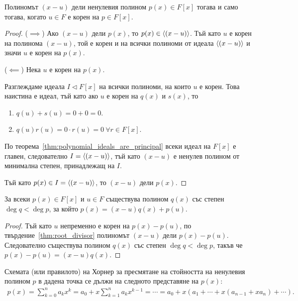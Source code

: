 \documentclass[numbers=endperiod, bibliography=totocnumbered]{scrartcl}
\begin{document}
\begin{proposition}\label{thm:root_divisor}
  Полиномът \( (x - u) \) дели ненулевия полином \( p(x) \in F[x] \) тогава и само тогава, когато \( u \in F \) е корен на \( p \in F[x] \).
\end{proposition}
\begin{proof}
  (\( \implies \)) Ако \( (x - u) \) дели \( p(x) \), то \( p(x) \in \left\langle (x - u) \right\rangle \). Тъй като \( u \) е корен на полинома \( (x - u) \), той е корен и на всички полиноми от идеала \( \left\langle (x - u) \right\rangle \) и значи \( u \) е корен на \( p(x) \).

  (\( \impliedby \)) Нека \( u \) е корен на \( p(x) \).

  Разглеждаме идеала \( I \lhd F[x] \) на всички полиноми, на които \( u \) е корен. Това наистина е идеал, тъй като ако \( u \) е корен на \( q(x) \) и \( s(x) \), то
  \begin{enumerate}
    \item \( q(u) + s(u) = 0 + 0 = 0 \).
    \item \( q(u) r(u) = 0 \cdot r(u) = 0~\forall r \in F[x] \).
  \end{enumerate}

  По теорема~\ref{thm:polynomial_ideals_are_principal} всеки идеал на \( F[x] \) е главен, следователно \( I = \left\langle (x - u) \right\rangle \), тъй като \( (x - u) \) е ненулев полином от минимална степен, принадлежащ на \( I \).

  Тъй като \( p(x) \in I = \left\langle (x - u) \right\rangle \), то \( (x - u) \) дели \( p(x) \).
\end{proof}

\begin{proposition}\label{thm:root_inexact_divisor}
  За всеки \( p(x) \in F[x] \) и \( u \in F \) съществува полином \( q(x) \) със степен \( \deg q < \deg p \), за който \( p(x) = (x - u) q(x) + p(u) \).
\end{proposition}
\begin{proof}
  Тъй като \( u \) непременно е корен на \( p(x) - p(u) \), по твърдение~\ref{thm:root_divisor} полиномът \( (x - u) \) дели \( p(x) - p(u) \). Следователно съществува полином \( q(x) \) със степен \( \deg q < \deg p \), такъв че \( p(x) - p(u) = (x - u) q(x) \).
\end{proof}

Схемата (или правилото) на Хорнер за пресмятане на стойността на ненулевия полином \( p \) в дадена точка се дължи на следното представяне на \( p(x) \):
\begin{align*}
  p(x) = \sum_{k=0}^n a_k x^k = a_0 + x \sum_{k=1}^n a_k x^{k-1} = \cdots = a_0 + x (a_1 + \cdots + x(a_{n-1} + x a_n) + \cdots).
\end{align*}
\end{document}
